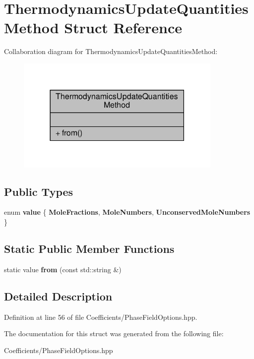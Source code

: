 \hypertarget{structThermodynamicsUpdateQuantitiesMethod}{}\section{Thermodynamics\+Update\+Quantities\+Method Struct Reference}
\label{structThermodynamicsUpdateQuantitiesMethod}


Collaboration diagram for Thermodynamics\+Update\+Quantities\+Method\+:\nopagebreak
\begin{figure}[H]
\begin{center}
\leavevmode
\includegraphics[width=282pt]{structThermodynamicsUpdateQuantitiesMethod__coll__graph}
\end{center}
\end{figure}
\subsection*{Public Types}
\begin{DoxyCompactItemize}
\item 
\mbox{\label{structThermodynamicsUpdateQuantitiesMethod_ad31a455ed88f6a945a0c051a63645186}} 
enum {\bfseries value} \{ {\bfseries Mole\+Fractions}, 
{\bfseries Mole\+Numbers}, 
{\bfseries Unconserved\+Mole\+Numbers}
 \}
\end{DoxyCompactItemize}
\subsection*{Static Public Member Functions}
\begin{DoxyCompactItemize}
\item 
\mbox{\label{structThermodynamicsUpdateQuantitiesMethod_a5600e836d4a8d0ca71b63f7e63bcb681}} 
static value {\bfseries from} (const std\+::string \&)
\end{DoxyCompactItemize}


\subsection{Detailed Description}


Definition at line 56 of file Coefficients/\+Phase\+Field\+Options.\+hpp.



The documentation for this struct was generated from the following file\+:\begin{DoxyCompactItemize}
\item 
Coefficients/\+Phase\+Field\+Options.\+hpp\end{DoxyCompactItemize}
